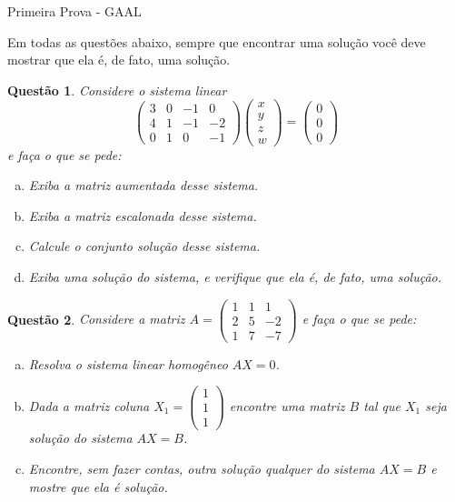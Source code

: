 \documentclass[a4paper,10pt]{article}
\author{Primeira Prova - GAAL}
\date{04 de Abril de 2019}
\title{}
\newtheorem{qst}{Questão}
\begin{document}
\begin{center}
	{\Large{\sc Primeira Prova - GAAL}}
\end{center}


Em todas as questões abaixo, sempre que encontrar uma solução você deve mostrar que ela é, de fato, uma solução.

\begin{qst}
	Considere o sistema linear
	\[\begin{pmatrix}
	3&0&-1&0\\4&1&-1&-2\\0&1&0&-1
	\end{pmatrix}\begin{pmatrix}
	x\\y\\z\\w
	\end{pmatrix}=\begin{pmatrix}
	0\\0\\0
	\end{pmatrix}\]e faça o que se pede:
	\begin{enumerate}[a)]
		\item Exiba a matriz aumentada desse sistema.
		\item Exiba a matriz escalonada desse sistema.
		\item Calcule o conjunto solução desse sistema.
		\item Exiba uma solução do sistema, e verifique que ela é, de fato, uma solução.
	\end{enumerate}
\end{qst}

\begin{qst}
	Considere a matriz $A=\begin{pmatrix}
	1&1&1\\2&5&-2\\1&7&-7
	\end{pmatrix}$ e faça o que se pede:
	\begin{enumerate}[a)]
		\item Resolva o sistema linear homogêneo $AX=0$.
		\item Dada a matriz coluna $X_1=\begin{pmatrix}
		1\\1\\1
		\end{pmatrix}$ encontre uma matriz $B$ tal que $X_1$ seja solução do sistema $AX=B$.
		\item Encontre, sem fazer contas, outra solução qualquer do sistema $AX=B$ e mostre que ela é solução.
	\end{enumerate}
\end{qst}
\end{document}
